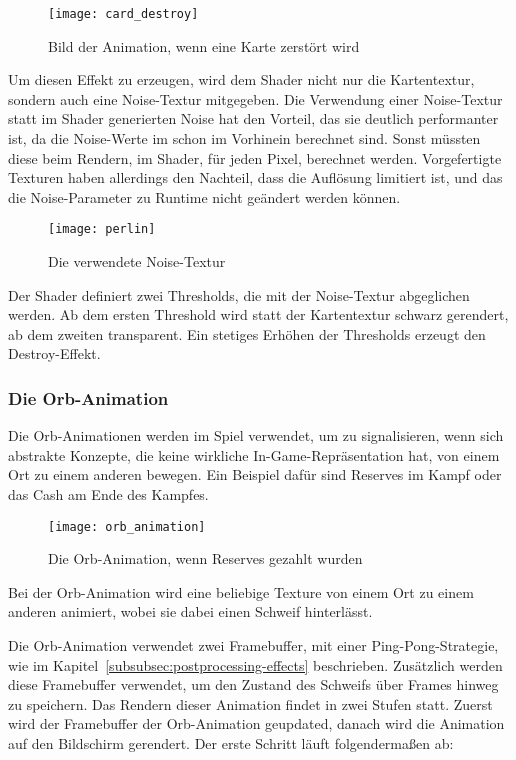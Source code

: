 \begin{figure}[H]
    \centering
    \texttt{[image: card\_destroy]}
    \caption{Bild der Animation, wenn eine Karte zerstört wird}
\end{figure}

Um diesen Effekt zu erzeugen, wird dem Shader nicht nur die Kartentextur, sondern auch eine Noise-Textur mitgegeben.
Die Verwendung einer Noise-Textur statt im Shader generierten Noise hat den Vorteil, das sie deutlich performanter ist,
da die Noise-Werte im schon im Vorhinein berechnet sind.
Sonst müssten diese beim Rendern, im Shader, für jeden Pixel, berechnet werden.
Vorgefertigte Texturen haben allerdings den Nachteil, dass die Auflösung limitiert ist, und das die Noise-Parameter
zu Runtime nicht geändert werden können.

\begin{figure}[H]
    \centering
    \texttt{[image: perlin]}
    \caption{Die verwendete Noise-Textur}
\end{figure}

Der Shader definiert zwei Thresholds, die mit der Noise-Textur abgeglichen werden.
Ab dem ersten Threshold wird statt der Kartentextur schwarz gerendert, ab dem zweiten transparent.
Ein stetiges Erhöhen der Thresholds erzeugt den Destroy-Effekt.

\subsubsection{Die Orb-Animation}

Die Orb-Animationen werden im Spiel verwendet, um zu signalisieren, wenn sich abstrakte Konzepte, die keine wirkliche
In-Game-Repräsentation hat, von einem Ort zu einem anderen bewegen.
Ein Beispiel dafür sind Reserves im Kampf oder das Cash am Ende des Kampfes.

\begin{figure}[H]
    \centering
    \texttt{[image: orb\_animation]}
    \caption{Die Orb-Animation, wenn Reserves gezahlt wurden}
\end{figure}

Bei der Orb-Animation wird eine beliebige Texture von einem Ort zu einem anderen animiert, wobei sie dabei einen Schweif
hinterlässt.

Die Orb-Animation verwendet zwei Framebuffer, mit einer Ping-Pong-Strategie, wie im
Kapitel~\ref{subsubsec:postprocessing-effects} beschrieben.
Zusätzlich werden diese Framebuffer verwendet, um den Zustand des Schweifs über Frames hinweg zu speichern.
Das Rendern dieser Animation findet in zwei Stufen statt.
Zuerst wird der Framebuffer der Orb-Animation geupdated, danach wird die Animation auf den Bildschirm gerendert.
Der erste Schritt läuft folgendermaßen ab:

